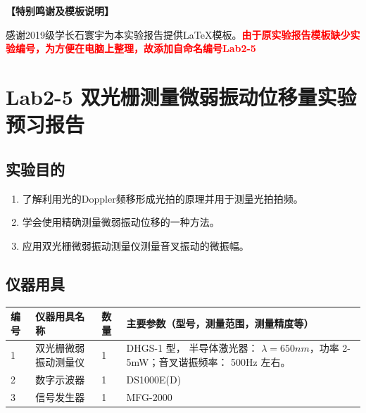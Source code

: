 \documentclass[dvipsnames, svgnames,a4paper,11pt]{article}
\begin{document}
	
	
	
	\textbf{【特别鸣谢及模板说明】}	
	
	感谢2019级学长石寰宇为本实验报告提供\LaTeX 模板。\textcolor{red}{\textbf{由于原实验报告模板缺少实验编号，为方便在电脑上整理，故添加自命名编号Lab2-5}}
	
	
	
	\clearpage
	\tableofcontents
	\clearpage
	
	
	
	
	\setcounter{section}{0}
	\section{Lab2-5 双光栅测量微弱振动位移量实验 \quad\heiti 预习报告}
	
	\subsection{实验目的}
	\begin{enumerate}
		\item 了解利用光的Doppler频移形成光拍的原理并用于测量光拍拍频。
		\item 学会使用精确测量微弱振动位移的一种方法。
		\item 应用双光栅微弱振动测量仪测量音叉振动的微振幅。		
	\end{enumerate}
	
	\subsection{仪器用具}
	\begin{table}[htbp]
		\centering
		\renewcommand\arraystretch{1.6}
		\begin{tabular}{p{}|p{}|p{}|p{}}
			\hline
			编号& 仪器用具名称 & 数量 &  主要参数（型号，测量范围，测量精度等） \\
			\hline
			1&双光栅微弱振动测量仪 	&1 	& DHGS-1 型， 半导体激光器： $\lambda=650nm$，功率 2-5mW；音叉谐振频率： 500Hz 左右。\\
			
			2&数字示波器 	&1 	& DS1000E(D) \\
			
			3&信号发生器 &1 & MFG-2000\\
			
			\hline
		\end{tabular}
	\end{table}
	
\end{document}
